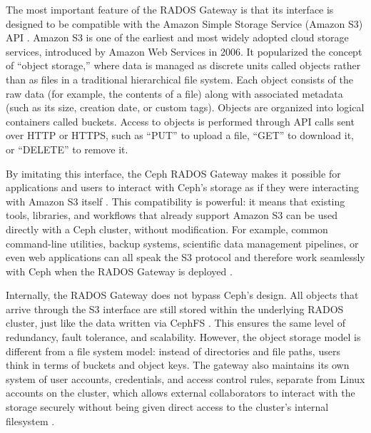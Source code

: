 The most important feature of the RADOS Gateway is that its interface is 
designed to be compatible with the Amazon Simple Storage Service (Amazon S3) 
API \parencite{Ceph_RGW_S3}. Amazon S3 is one of the earliest and most widely 
adopted cloud storage services, introduced by Amazon Web Services in 2006. It 
popularized the concept of “object storage,” where data is managed as discrete 
units called objects rather than as files in a traditional hierarchical file 
system. Each object consists of the raw data (for example, the contents of a 
file) along with associated metadata (such as its size, creation date, or custom 
tags). Objects are organized into logical containers called buckets. Access to 
objects is performed through API calls sent over HTTP or HTTPS, such as “PUT” 
to upload a file, “GET” to download it, or “DELETE” to remove it.

\medskip

By imitating this interface, the Ceph RADOS Gateway makes it possible for 
applications and users to interact with Ceph’s storage as if they were 
interacting with Amazon S3 itself \parencite{Ceph_RGW_S3,Ceph_RGW_Overview}. This 
compatibility is powerful: it means that existing tools, libraries, and 
workflows that already support Amazon S3 can be used directly with a Ceph 
cluster, without modification. For example, common command-line utilities, 
backup systems, scientific data management pipelines, or even web applications 
can all speak the S3 protocol and therefore work seamlessly with Ceph when the 
RADOS Gateway is deployed \parencite{Ceph_RGW_S3}.

\medskip

Internally, the RADOS Gateway does not bypass Ceph’s design. All objects that 
arrive through the S3 interface are still stored within the underlying RADOS 
cluster, just like the data written via CephFS \parencite{Ceph_RGW_Overview}. This 
ensures the same level of redundancy, fault tolerance, and scalability. However, 
the object storage model is different from a file system model: instead of 
directories and file paths, users think in terms of buckets and object keys. The 
gateway also maintains its own system of user accounts, credentials, and access 
control rules, separate from Linux accounts on the cluster, which allows 
external collaborators to interact with the storage securely without being given 
direct access to the cluster’s internal 
filesystem \parencite{Ceph_RGW_Overview,Ceph_RGW_S3}.

\medskip

